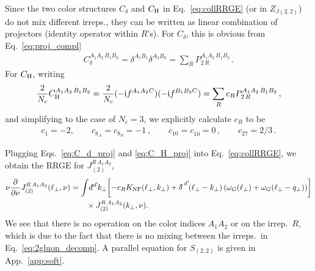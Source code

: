 \documentclass[letterpaper,11pt]{article}
\newcommand{\eq}[1]{Eq.~\eqref{eq:#1}}
\newcommand{\eqs}[2]{Eqs.~\eqref{eq:#1} and \eqref{eq:#2}}
\newcommand{\app}[1]{App.~\ref{app:#1}}
\newcommand{\img}{\mathrm{i}}
\newcommand{\deltaslash}{{\delta\!\!\!{}^-}}
\newcommand{\nn}{\nonumber}
\newcommand\prnth[1]{\left(#1\right)}
\newcommand{\dbar}{d\hspace*{-0.08em}\bar{}\hspace*{0.1em}}
\begin{document}
Since the two color structures $C_\delta$ and $C_{\rm H}$ in \eq{collRRGE} (or in $Z_{J(2,2)}$) do not mix different irreps., they can be written as linear combination of projectors (identity operator within $R$'s). For $C_\delta$, this is obvious from \eq{proj_compl}
\begin{align}\label{eq:C_d_proj}
  C_\delta^{A_1 A_2\, B_1 B_2} = \delta^{A_1B_1}\delta^{A_2B_2} = \sum_R P_{2 \, R}^{A_1 A_2\, B_1 B_2}\,.
\end{align}
For $C_{\rm H}$, writing
\begin{align}\label{eq:C_H_proj}
  \frac{2}{N_c}C_{\rm H}^{A_1 A_2\, B_1 B_2}=\frac{2}{N_c} (-\img f^{A_1A_2C})(-\img f^{B_1B_2C}) = \sum_R c_R P_{2\, R}^{A_1 A_2\, B_1 B_2}\,,
\end{align}
and simplifying to the case of $N_c=3$, we explicitly calculate $c_R$ to be
\begin{align}
 c_1 = -2, \qquad c_{8_A} = c_{8_S} = -1\,, \qquad
 c_{10} = c_{\overline{10}} = 0\,, \qquad
 c_{27} = 2/3\,.
\end{align}


Plugging \eqs{C_d_proj}{C_H_proj} into \eq{collRRGE}, we obtain the RRGE for $J_{(2)}^{R\,A_1A_2}$,
\begin{align} \label{eq:collRRGE2}
 \nu\frac{\partial}{\partial \nu}J_{(2)}^{R\, A_1 A_2}(\ell_\perp,\nu) 
%
      &= \int\! \dbar^{d'}\!k_\perp \biggl[ -c_R  K_\text{NF}(\ell_\perp, k_\perp)
+ \deltaslash^{d'}\!(\ell_\perp- k_\perp) \prnth{\omega_G(\ell_\perp) + \omega_G(\ell_\perp-q_\perp)} \biggr]
 \nn\\
& \qquad \times J_{(2)}^{R\, A_1 A_2}(k_\perp,\nu).
\end{align}
We see that there is no operation on the color indices $A_1 A_2$ or on the irrep.~$R$, which is due to the fact that there is no mixing between the irreps.~in \eq{2gluon_decomp}.
A parallel equation for $S_{(2,2)}$ is given in \app{soft}.
\end{document}
